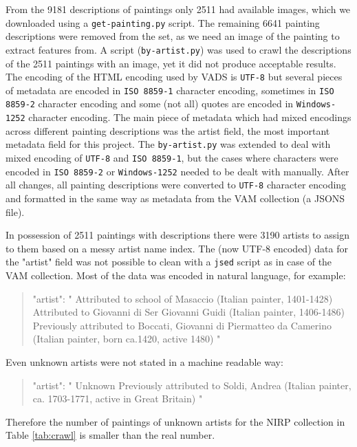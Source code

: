 \documentclass[11pt,a4paper,draft]{report}
\begin{document}
\begin{multicols}{2}
From the 9181 descriptions of paintings only 2511 had available images, which
we downloaded using a \texttt{get-painting.py} script.  The remaining 6641
painting descriptions were removed from the set, as we need an image of the
painting to extract features from.  A script (\texttt{by-artist.py}) was used
to crawl the descriptions of the 2511 paintings with an image, yet it did not
produce acceptable results.  The encoding of the HTML encoding used by VADS is
\texttt{UTF-8} but several pieces of metadata are encoded in \texttt{ISO
8859-1} character encoding, sometimes in \texttt{ISO 8859-2} character encoding
and some (not all) quotes are encoded in \texttt{Windows-1252} character
encoding.  The main piece of metadata which had mixed encodings across
different painting descriptions was the artist field, the most important
metadata field for this project.  The \texttt{by-artist.py} was extended to
deal with mixed encoding of \texttt{UTF-8} and \texttt{ISO 8859-1}, but the
cases where characters were encoded in \texttt{ISO 8859-2} or
\texttt{Windows-1252} needed to be dealt with manually.  After all changes, all
painting descriptions were converted to \texttt{UTF-8} character encoding and
formatted in the same way as metadata from the VAM collection (a JSONS file).

In possession of 2511 paintings with descriptions there were 3190 artists to
assign to them based on a messy artist name index.  The (now UTF-8 encoded)
data for the "artist" field was not possible to clean with a \texttt{jsed}
script as in case of the VAM collection.  Most of the data was encoded in
natural language, for example:

\begin{quote}
"artist": " Attributed to school of Masaccio (Italian painter, 1401-1428)
Attributed to Giovanni di Ser Giovanni Guidi (Italian painter, 1406-1486)
Previously attributed to Boccati, Giovanni di Piermatteo da Camerino (Italian
painter, born ca.1420, active 1480) "
\end{quote}

Even unknown artists were not stated in a machine readable way:

\begin{quote}
"artist": " Unknown  Previously attributed to Soldi, Andrea (Italian painter,
ca.  1703-1771, active in Great Britain) "
\end{quote}

Therefore the number of paintings of unknown artists for the NIRP collection in
Table \ref{tab:crawl} is smaller than the real number.


\end{multicols}
\end{document}
